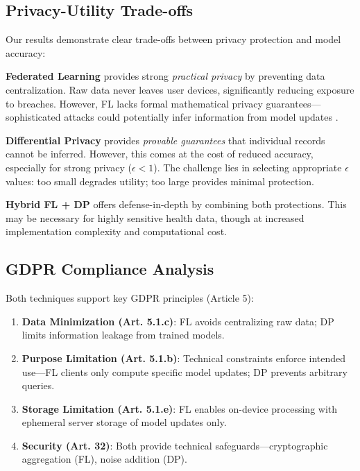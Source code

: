 \documentclass[conference]{IEEEtran}
\begin{document}
\subsection{Privacy-Utility Trade-offs}

Our results demonstrate clear trade-offs between privacy protection and model accuracy:

\textbf{Federated Learning} provides strong \textit{practical privacy} by preventing data centralization. Raw data never leaves user devices, significantly reducing exposure to breaches. However, FL lacks formal mathematical privacy guarantees—sophisticated attacks could potentially infer information from model updates \cite{nasr2019comprehensive}.

\textbf{Differential Privacy} provides \textit{provable guarantees} that individual records cannot be inferred. However, this comes at the cost of reduced accuracy, especially for strong privacy ($\epsilon < 1$). The challenge lies in selecting appropriate $\epsilon$ values: too small degrades utility; too large provides minimal protection.

\textbf{Hybrid FL + DP} offers defense-in-depth by combining both protections. This may be necessary for highly sensitive health data, though at increased implementation complexity and computational cost.

\subsection{GDPR Compliance Analysis}

Both techniques support key GDPR principles (Article 5):

\begin{enumerate}
    \item \textbf{Data Minimization (Art. 5.1.c)}: FL avoids centralizing raw data; DP limits information leakage from trained models.
    
    \item \textbf{Purpose Limitation (Art. 5.1.b)}: Technical constraints enforce intended use—FL clients only compute specific model updates; DP prevents arbitrary queries.
    
    \item \textbf{Storage Limitation (Art. 5.1.e)}: FL enables on-device processing with ephemeral server storage of model updates only.
    
    \item \textbf{Security (Art. 32)}: Both provide technical safeguards—cryptographic aggregation (FL), noise addition (DP).
\end{enumerate}
\end{document}
